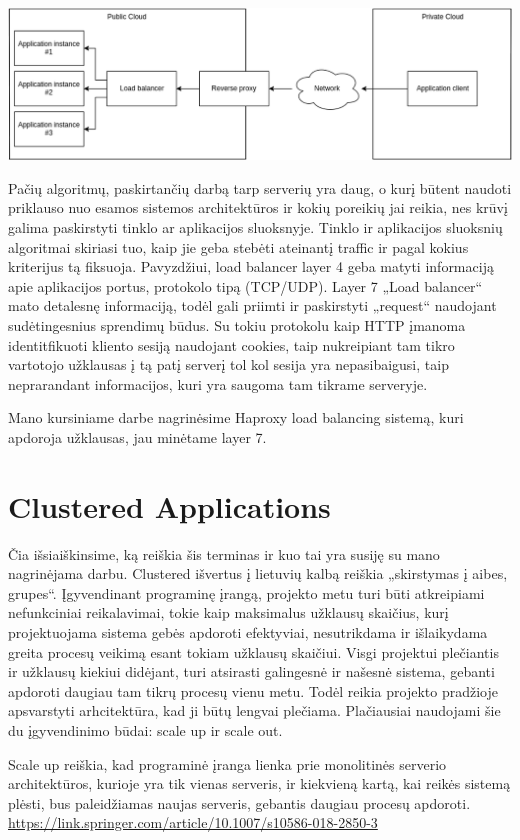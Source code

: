 \documentclass{VUMIFPSkursinis}
\begin{document}
\graphicspath{ {./img/} }
 \includegraphics[width=150mm,scale=0.5]{load-balancing}

Pačių algoritmų, paskirtančių darbą tarp serverių yra daug, o kurį būtent naudoti priklauso nuo esamos sistemos architektūros ir kokių poreikių jai reikia, nes krūvį galima paskirstyti tinklo ar aplikacijos sluoksnyje. Tinklo ir aplikacijos sluoksnių algoritmai skiriasi tuo, kaip jie geba stebėti ateinantį traffic ir pagal kokius kriterijus tą fiksuoja. Pavyzdžiui, load balancer layer 4 geba matyti informaciją apie aplikacijos portus, protokolo tipą (TCP/UDP). Layer 7 „Load balancer“ mato detalesnę informaciją, todėl gali priimti ir paskirstyti „request“ naudojant sudėtingesnius sprendimų būdus. Su tokiu protokolu kaip HTTP įmanoma identitfikuoti kliento sesiją naudojant cookies, taip nukreipiant tam tikro vartotojo užklausas į tą patį serverį tol kol sesija yra nepasibaigusi, taip neprarandant informacijos, kuri yra saugoma tam tikrame serveryje.
 
Mano kursiniame darbe nagrinėsime Haproxy load balancing sistemą, kuri apdoroja užklausas, jau minėtame layer 7.

\section{Clustered Applications}
	Čia išsiaiškinsime, ką reiškia šis terminas ir kuo tai yra susiję su mano nagrinėjama darbu. Clustered išvertus į lietuvių kalbą reiškia „skirstymas į aibes, grupes“. Įgyvendinant programinę įrangą, projekto metu turi būti atkreipiami nefunkciniai reikalavimai, tokie kaip maksimalus užklausų skaičius, kurį projektuojama sistema gebės apdoroti efektyviai, nesutrikdama ir išlaikydama greita procesų veikimą esant tokiam užklausų skaičiui. Visgi projektui plečiantis ir užklausų kiekiui didėjant, turi atsirasti galingesnė ir našesnė sistema, gebanti apdoroti daugiau tam tikrų procesų vienu metu. Todėl reikia projekto pradžioje apsvarstyti arhcitektūra, kad ji būtų lengvai plečiama. Plačiausiai naudojami šie du įgyvendinimo būdai: scale up ir scale out.

Scale up reiškia, kad programinė įranga lienka prie monolitinės serverio architektūros, kurioje yra tik vienas serveris, ir kiekvieną kartą, kai reikės sistemą plėsti, bus paleidžiamas naujas serveris, gebantis daugiau procesų apdoroti.
\url {https://link.springer.com/article/10.1007/s10586-018-2850-3}
\end{document}
